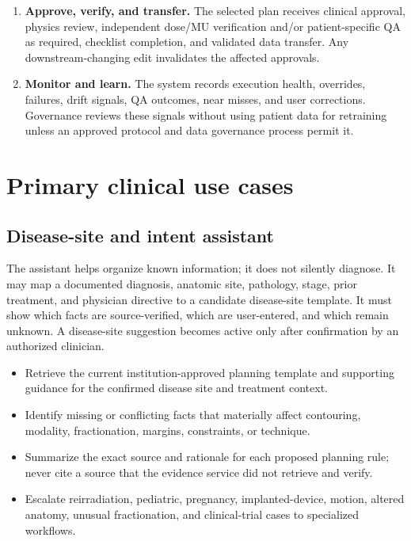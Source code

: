 \documentclass[11pt,letterpaper]{article}
\begin{document}
\begin{enumerate}
\item \textbf{Approve, verify, and transfer.} The selected plan receives clinical approval, physics review, independent dose\slash\allowbreak{}MU verification and\slash\allowbreak{}or patient-specific QA as required, checklist completion, and validated data transfer. Any downstream-changing edit invalidates the affected approvals.
\item \textbf{Monitor and learn.} The system records execution health, overrides, failures, drift signals, QA outcomes, near misses, and user corrections. Governance reviews these signals without using patient data for retraining unless an approved protocol and data governance process permit it.
\end{enumerate}

\section{Primary clinical use cases}

\subsection{Disease-site and intent assistant}

The assistant helps organize known information; it does not silently diagnose. It may map a documented diagnosis, anatomic site, pathology, stage, prior treatment, and physician directive to a candidate disease-site template. It must show which facts are source-verified, which are user-entered, and which remain unknown. A disease-site suggestion becomes active only after confirmation by an authorized clinician.

\begin{itemize}
\item Retrieve the current institution-approved planning template and supporting guidance for the confirmed disease site and treatment context.
\item Identify missing or conflicting facts that materially affect contouring, modality, fractionation, margins, constraints, or technique.
\item Summarize the exact source and rationale for each proposed planning rule; never cite a source that the evidence service did not retrieve and verify.
\item Escalate reirradiation, pediatric, pregnancy, implanted-device, motion, altered anatomy, unusual fractionation, and clinical-trial cases to specialized workflows.
\end{itemize}
\end{document}
